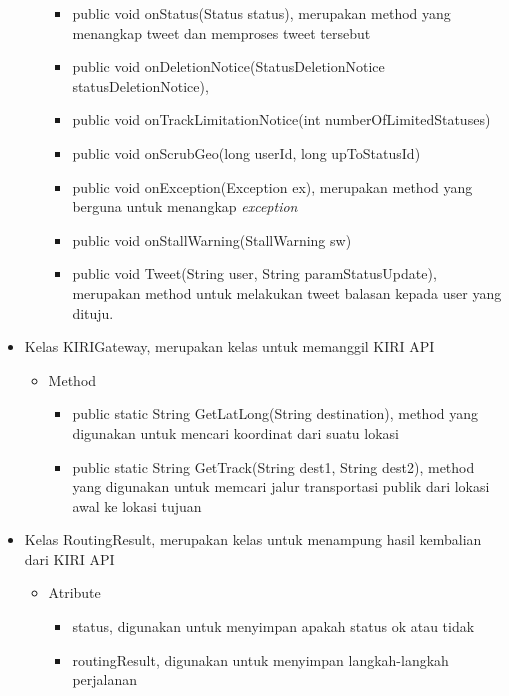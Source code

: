 \begin{itemize}
\begin{itemize}
									\begin{itemize}
												\item public void onStatus(Status status), merupakan method yang menangkap tweet dan memproses tweet tersebut
												\item public void onDeletionNotice(StatusDeletionNotice statusDeletionNotice),
												\item public void onTrackLimitationNotice(int numberOfLimitedStatuses)
												\item public void onScrubGeo(long userId, long upToStatusId)
												\item public void onException(Exception ex), merupakan method yang berguna untuk menangkap \textit{exception}
												\item public void onStallWarning(StallWarning sw)
												\item public void Tweet(String user, String paramStatusUpdate), merupakan method untuk melakukan tweet balasan kepada user yang dituju.
									\end{itemize}
				\end{itemize}
		
		\item Kelas KIRIGateway, merupakan kelas untuk memanggil KIRI API
		
		
				\begin{itemize}
							\item Method
							
							
									\begin{itemize}
												\item public static String GetLatLong(String destination), method yang digunakan untuk mencari koordinat dari suatu lokasi
												\item public static String GetTrack(String dest1, String dest2), method yang digunakan untuk memcari jalur transportasi publik dari lokasi awal ke lokasi tujuan
									\end{itemize}
				\end{itemize}
		
		
		\item Kelas RoutingResult, merupakan kelas untuk menampung hasil kembalian dari KIRI API
		
		
				\begin{itemize}
							\item Atribute
					
					
									\begin{itemize}
												\item status, digunakan untuk menyimpan apakah status ok atau tidak
												\item routingResult, digunakan untuk menyimpan langkah-langkah perjalanan
									\end{itemize}
					

\end{itemize}
\end{itemize}
